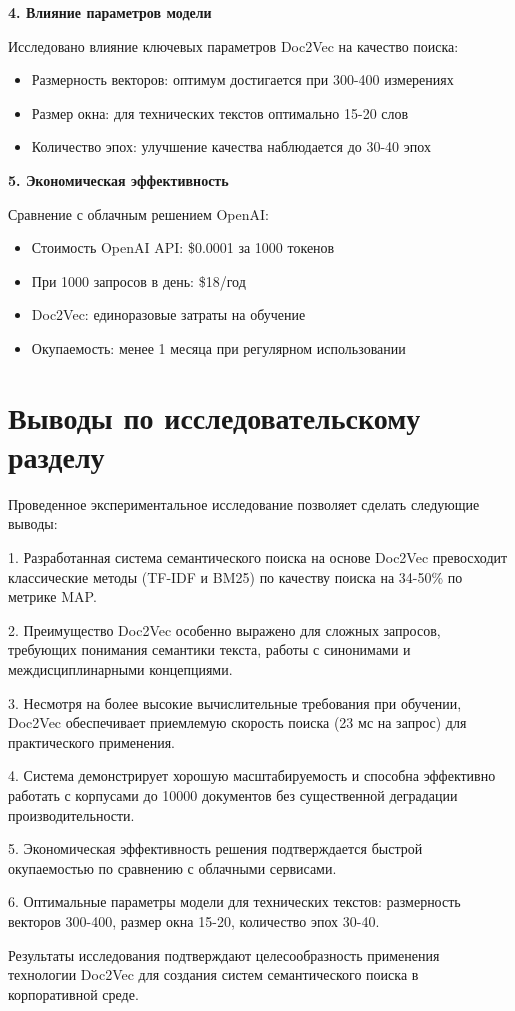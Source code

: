 \textbf{4. Влияние параметров модели}

Исследовано влияние ключевых параметров Doc2Vec на качество поиска:

\begin{itemize}
	\item Размерность векторов: оптимум достигается при 300-400 измерениях
	\item Размер окна: для технических текстов оптимально 15-20 слов
	\item Количество эпох: улучшение качества наблюдается до 30-40 эпох
\end{itemize}

\textbf{5. Экономическая эффективность}

Сравнение с облачным решением OpenAI:
\begin{itemize}
	\item Стоимость OpenAI API: \$0.0001 за 1000 токенов
	\item При 1000 запросов в день: \$18/год
	\item Doc2Vec: единоразовые затраты на обучение
	\item Окупаемость: менее 1 месяца при регулярном использовании
\end{itemize}

\section{Выводы по исследовательскому разделу}

Проведенное экспериментальное исследование позволяет сделать следующие выводы:

1. Разработанная система семантического поиска на основе Doc2Vec превосходит классические методы (TF-IDF и BM25) по качеству поиска на 34-50\% по метрике MAP.

2. Преимущество Doc2Vec особенно выражено для сложных запросов, требующих понимания семантики текста, работы с синонимами и междисциплинарными концепциями.

3. Несмотря на более высокие вычислительные требования при обучении, Doc2Vec обеспечивает приемлемую скорость поиска (23 мс на запрос) для практического применения.

4. Система демонстрирует хорошую масштабируемость и способна эффективно работать с корпусами до 10000 документов без существенной деградации производительности.

5. Экономическая эффективность решения подтверждается быстрой окупаемостью по сравнению с облачными сервисами.

6. Оптимальные параметры модели для технических текстов: размерность векторов 300-400, размер окна 15-20, количество эпох 30-40.

Результаты исследования подтверждают целесообразность применения технологии Doc2Vec для создания систем семантического поиска в корпоративной среде.